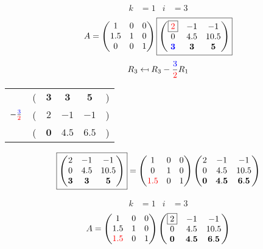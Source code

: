 \documentclass[pdf]{beamer}
\begin{document}
\begin{frame}{}\begin{align*} k &= 1 & i &= 3 \end{align*} $$A=\begin{pmatrix}1&0&0\\1.5&1&0\\0&0&1\end{pmatrix} \boxed{\begin{pmatrix}\boxed{{\color{red}2}}&-1&-1\\0&4.5&10.5\\\mathbf{{\color{blue}3}}&\mathbf{3}&\mathbf{5}\end{pmatrix}} $$ $$R_3 \mapsfrom R_3 - \frac{{\color{blue}3}}{{\color{red}2}} R_1$$ \begin{center}\begin{tabular}{cccccc}  &(& $ \mathbf{3} $ & $ \mathbf{3} $ & $ \mathbf{5} $ &)\\$ -\frac{{\color{blue}3}}{{\color{red}2}} $&(& $ 2 $ & $ -1 $ & $ -1 $ &)\\\hline  &(& $ \mathbf{0} $ & $ \mathbf{4.5} $ & $ \mathbf{6.5} $ &) \end{tabular}\end{center} $$ \boxed{\begin{pmatrix}2&-1&-1\\0&4.5&10.5\\\mathbf{3}&\mathbf{3}&\mathbf{5}\end{pmatrix}} = \begin{pmatrix}1&0&0\\0&1&0\\{\color{red}1.5}&0&1\end{pmatrix} \begin{pmatrix}2&-1&-1\\0&4.5&10.5\\\mathbf{0}&\mathbf{4.5}&\mathbf{6.5}\end{pmatrix} $$\end{frame}
\begin{frame}{}\begin{align*} k &= 1 & i &= 3 \end{align*}$$A=\begin{pmatrix}1&0&0\\1.5&1&0\\{\color{red}1.5}&0&1\end{pmatrix} \begin{pmatrix}\boxed{2}&-1&-1\\0&4.5&10.5\\\mathbf{0}&\mathbf{4.5}&\mathbf{6.5}\end{pmatrix} $$\end{frame}
\end{document}
